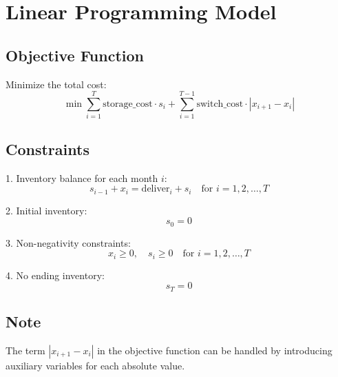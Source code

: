\documentclass{article}
\begin{document}
\section*{Linear Programming Model}

\subsection*{Objective Function}

Minimize the total cost:
\[
\min \sum_{i=1}^{T} \text{storage\_cost} \cdot s_i + \sum_{i=1}^{T-1} \text{switch\_cost} \cdot |x_{i+1} - x_i|
\]

\subsection*{Constraints}

1. Inventory balance for each month \( i \):
   \[
   s_{i-1} + x_i = \text{deliver}_i + s_i \quad \text{for } i = 1, 2, \ldots, T
   \]

2. Initial inventory:
   \[
   s_0 = 0
   \]

3. Non-negativity constraints:
   \[
   x_i \geq 0, \quad s_i \geq 0 \quad \text{for } i = 1, 2, \ldots, T
   \]

4. No ending inventory:
   \[
   s_T = 0
   \]

\subsection*{Note}
The term \( |x_{i+1} - x_i| \) in the objective function can be handled by introducing auxiliary variables for each absolute value.
\end{document}
